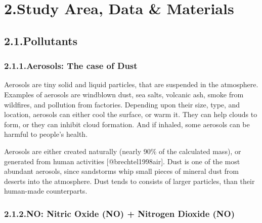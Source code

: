 \documentclass[9pt]{report}
\begin{document}
\section{2.\hspace*{0.5em}Study Area, Data \& Materials}\label{sec-study-area-data-materials}%

\subsection{2.1.\hspace*{0.5em}Pollutants}\label{sec-pollutants}%

\subsubsection{2.1.1.\hspace*{0.5em}Aerosols: The case of Dust}\label{sec-aerosols--the-case-of-dust}%

\noindent{}Aerosols  are  tiny  solid  and  liquid  particles,  that  are  suspended  in  the atmosphere. Examples  of  aerosols  are    windblown  dust,  sea salts,  volcanic ash,  smoke  from  wildfires,  and  pollution  from  factories. Depending  upon their size, type, and location, aerosols can either cool the surface, or warm it. They  can  help  clouds  to  form,  or  they  can  inhibit  cloud formation. And  if inhaled, some aerosols can be harmful to people's health.%

Aerosols  are  either  created  naturally  (nearly  90\%  of  the  calculated mass), or generated from  human activities [@brechtel1998air]. Dust is one of  the  most  abundant  aerosols,  since   sandstorms  whip small  pieces  of mineral  dust  from  deserts  into  the  atmosphere. Dust  tends  to  consists  of larger  particles, than  their  human-made  counterparts.%

\subsubsection{2.1.2.\hspace*{0.5em}NO: Nitric Oxide (NO) + Nitrogen Dioxide (NO)}\label{sec-nox--nitric-oxide-no-nitrogen-dioxide-no2}%
\end{document}
